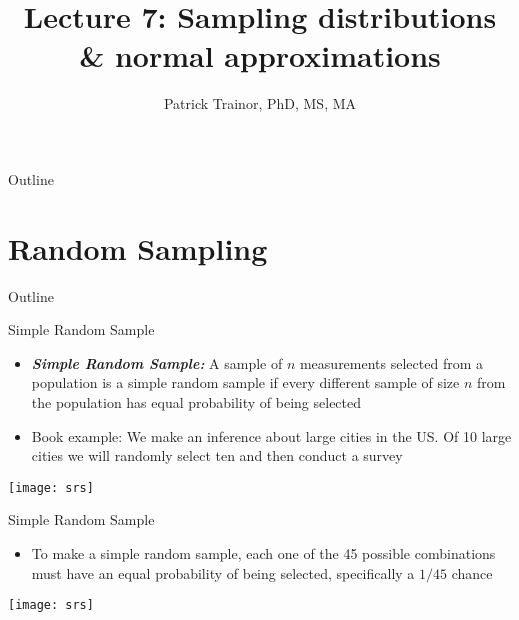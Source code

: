 \documentclass[xcolor=dvipsnames]{beamer}
\title[Lecture 7]{Lecture 7: Sampling distributions \& normal approximations}
\author[Patrick Trainor]{Patrick Trainor, PhD, MS, MA}
\institute[NMSU]{New Mexico State University}
\date{}
\begin{document}
	
\begin{frame}
	\maketitle
\end{frame}

\begin{frame}{Outline}
	\tableofcontents[hideallsubsections]
\end{frame}

\section{Random Sampling}
\begin{frame}{Outline}
	\tableofcontents[currentsection,subsectionstyle=show/shaded/hide]
\end{frame}

\begin{frame}{Simple Random Sample}
	\begin{itemize}
		\item \textbf{\emph{Simple Random Sample:}} A sample of $n$ measurements selected from a population is a simple random sample if every different sample of size $n$ from the population has equal probability of being selected \pause 
		\item Book example: We make an inference about large cities in the US. Of 10 large cities we will randomly select ten and then conduct a survey \pause 
	\end{itemize}
	\begin{center}
		\texttt{[image: srs]}
	\end{center}
\end{frame}

\begin{frame}{Simple Random Sample}
	\begin{itemize}
		\item To make a simple random sample, each one of the 45 possible combinations must have an equal probability of being selected, specifically a $1/45$ chance 
	\end{itemize}
	\begin{center}
		\texttt{[image: srs]}
	\end{center}
\end{frame}
\end{document}
